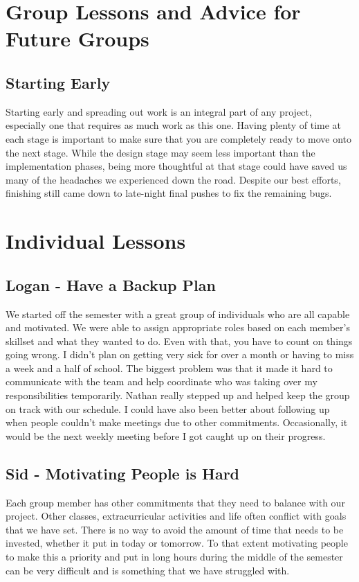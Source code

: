 \section{Group Lessons and Advice for Future Groups}
\subsection{Starting Early}
Starting early and spreading out work is an integral part of any project, especially one that requires as much work as this one. Having plenty of time at each stage is important to make sure that you are completely ready to move onto the next stage. While the design stage may seem less important than the implementation phases, being more thoughtful at that stage could have saved us many of the headaches we experienced down the road. Despite our best efforts, finishing still came down to late-night final pushes to fix the remaining bugs.

\section{Individual Lessons}
\subsection{Logan - Have a Backup Plan}
We started off the semester with a great group of individuals who are all capable and motivated. We were able to assign appropriate roles based on each member's skillset and what they wanted to do. Even with that, you have to count on things going wrong. I didn't plan on getting very sick for over a month or having to miss a week and a half of school. The biggest problem was that it made it hard to communicate with the team and help coordinate who was taking over my responsibilities temporarily. Nathan really stepped up and helped keep the group on track with our schedule. I could have also been better about following up when people couldn't make meetings due to other commitments. Occasionally, it would be the next weekly meeting before I got caught up on their progress. 

\subsection{Sid - Motivating People is Hard}
Each group member has other commitments that they need to balance with our project. Other classes, extracurricular activities and life often conflict with goals that we have set. There is no way to avoid the amount of time that needs to be invested, whether it put in today or tomorrow. To that extent motivating people to make this a priority and put in long hours during the middle of the semester can be very difficult and is something that we have struggled with. 

